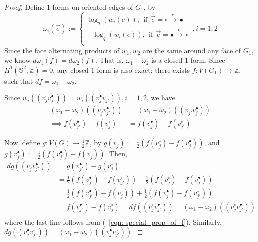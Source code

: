 \documentclass[10pt,a4paper]{amsart}
\begin{document}
\begin{proof}
    Define $1$-forms on oriented edges of $G_1$, by $$\omega_i(\Vec{e}):=\begin{cases}
        \log_q(w_i(e)), \:\:\text{if}\:\:\Vec{e}=\circ\xrightarrow[]{e}\bullet\\
        -\log_q(w_i(e)),
        \:\:\text{if}\:\:\Vec{e}=\bullet\xrightarrow[]{e}\circ\\
    \end{cases}, i=1,2$$ 
    Since the face alternating products of $w_1,w_2$ are the same around any face of $G_1$, we know $d\omega_1(f) =d\omega_2(f)$. That is, $\omega_1-\omega_2$ is a closed $1$-form. Since $H^1(\mathbb{S}^2;\mathbb{Z})=0$, any closed $1$-form is also exact: there exists $f: V(G_1)\rightarrow \mathbb{Z}$, such that $df = \omega_1-\omega_2$. 

    Since $w_i((v^\circ_jv^\bullet_{j'}))=w_i((v^\bullet_jv^\circ_{j'})), i=1,2$, we have 
    \begin{equation}\label{eqn: special_prop_of_f}
        \begin{split}
            (\omega_1-\omega_2)((v^\circ_jv^\bullet_{j'})) &= (\omega_1-\omega_2)((v^\circ_{j'}v^\bullet_{j}))\\
            \implies f(v^\bullet_{j'})-f(v^\circ_j) &= f(v^\bullet_{j})-f(v^\circ_{j'})
        \end{split}
    \end{equation}
    
    Now, define $g:V(G)\rightarrow \frac{1}{2}\mathbb{Z}$, by $g(v^\circ_j) := \frac{1}{2}(f(v^\circ_j)-f(v^\bullet_j))$, and $g(v^\bullet_j) := \frac{1}{2}(f(v^\bullet_j)-f(v^\circ_j))$. Then,
    \begin{equation*}
        \begin{split}
            dg((v^\circ_jv^\bullet_{j'}))&= g(v^\bullet_{j'})-g(v^\circ_j)\\
            &= \frac{1}{2}(f(v^\bullet_{j'})-f(v^\circ_{j'}))-\frac{1}{2}(f(v^\circ_j)-f(v^\bullet_j))\\
            &= \frac{1}{2}(f(v^\bullet_{j'})-f(v^\circ_j))+\frac{1}{2}(f(v^\bullet_j)-f(v^\circ_{j'}))\\
            &= f(v^\bullet_{j'})-f(v^\circ_j) = df((v^\circ_jv^\bullet_{j'}))=(\omega_1-\omega_2)((v^\circ_jv^\bullet_{j'}))\\
        \end{split}
    \end{equation*}
    where the last line follows from (~\ref{eqn: special_prop_of_f}). Similarly, $dg((v^\bullet_jv^\circ_{j'})) = (\omega_1-\omega_2)((v^\bullet_jv^\circ_{j'}))$. 


\end{proof}
\end{document}
